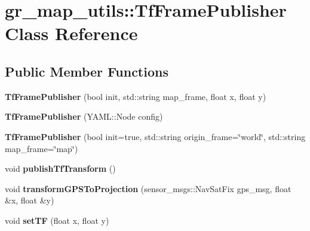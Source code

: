 \hypertarget{classgr__map__utils_1_1TfFramePublisher}{}\section{gr\+\_\+map\+\_\+utils\+:\+:Tf\+Frame\+Publisher Class Reference}
\label{classgr__map__utils_1_1TfFramePublisher}
\subsection*{Public Member Functions}
\begin{DoxyCompactItemize}
\item 
\mbox{\label{classgr__map__utils_1_1TfFramePublisher_a84bfaa18bd29437440a4f48de52acf97}} 
{\bfseries Tf\+Frame\+Publisher} (bool init, std\+::string map\+\_\+frame, float x, float y)
\item 
\mbox{\label{classgr__map__utils_1_1TfFramePublisher_a92985551818278c8112b5e14aee51248}} 
{\bfseries Tf\+Frame\+Publisher} (Y\+A\+M\+L\+::\+Node config)
\item 
\mbox{\label{classgr__map__utils_1_1TfFramePublisher_a9a4ee99fc161cef11c65a3b5515dba9c}} 
{\bfseries Tf\+Frame\+Publisher} (bool init=true, std\+::string origin\+\_\+frame=\char`\"{}world\char`\"{}, std\+::string map\+\_\+frame=\char`\"{}map\char`\"{})
\item 
\mbox{\label{classgr__map__utils_1_1TfFramePublisher_a399a6ba3f9149ed8e95c7ae5960bc68c}} 
void {\bfseries publish\+Tf\+Transform} ()
\item 
\mbox{\label{classgr__map__utils_1_1TfFramePublisher_a71885fbf696664c186380d2251efe9d5}} 
void {\bfseries transform\+G\+P\+S\+To\+Projection} (sensor\+\_\+msgs\+::\+Nav\+Sat\+Fix gps\+\_\+msg, float \&x, float \&y)
\item 
\mbox{\label{classgr__map__utils_1_1TfFramePublisher_af9402e7d053fb7fbf1f390021a1e8e43}} 
void {\bfseries set\+TF} (float x, float y)
\item 

\end{DoxyCompactItemize}
